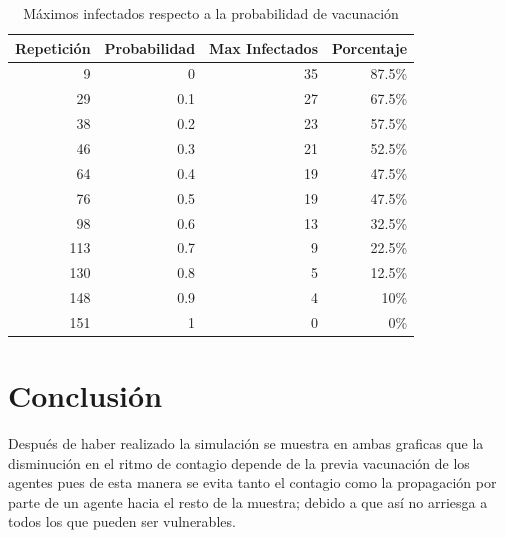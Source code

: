 \documentclass{article}
\begin{document}
\begin{table}[H]
\centering
\caption{M\'aximos infectados respecto a la probabilidad de vacunaci\'on}
\begin{tabular}{rrrr}
\hline
Repetici\'on & Probabilidad &  Max Infectados & Porcentaje \\
\hline
9 & 0 & 35 & 87.5\%\\
29 & 0.1 & 27 & 67.5\%\\
38 & 0.2 & 23 & 57.5\%\\
46 & 0.3 & 21 & 52.5\%\\
64 & 0.4 & 19 & 47.5\%\\
76 & 0.5 & 19 & 47.5\%\\
98 & 0.6 & 13 & 32.5\%\\
113& 0.7 & 9 & 22.5\%\\
130 & 0.8 & 5 & 12.5\%\\
148 & 0.9 & 4 & 10\%\\
151 & 1 & 0 & 0\%\\

\hline
\end{tabular}
\label{t1}
\end{table}

\section{Conclusi\'on}

Despu\'es de haber realizado la simulaci\'on se muestra en ambas graficas que la disminuci\'on en el ritmo de contagio depende de la previa vacunaci\'on de los agentes pues de esta manera se evita tanto el contagio como la propagaci\'on por parte de un agente hacia el resto de la muestra; debido a que as\'i no arriesga a todos los que pueden ser vulnerables.



\end{document}
